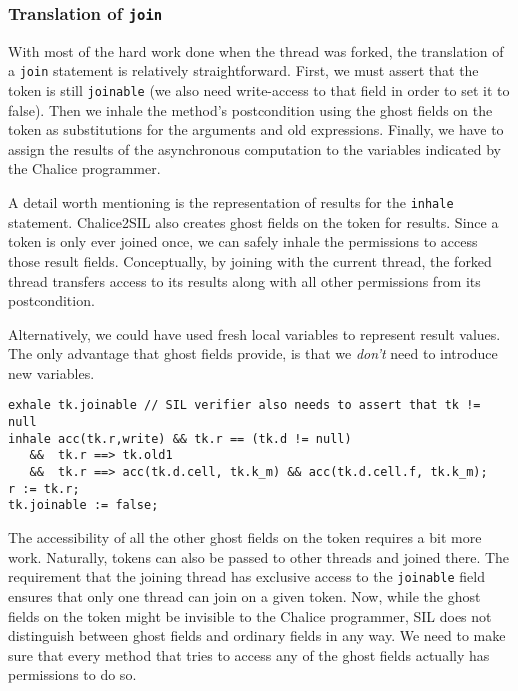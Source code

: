 \subsubsection{Translation of \lstinline!join!}\label{sct:fjjoin}
With most of the hard work done when the thread was forked, the translation of a \lstinline!join! statement is relatively straightforward.
First, we must assert that the token is still \lstinline!joinable! (we also need write-access to that field in order to set it to false). 
Then we inhale the method's postcondition using the ghost fields on the token as substitutions for the arguments and old expressions. 
Finally, we have to assign the results of the asynchronous computation to the variables indicated by the Chalice programmer.

A detail worth mentioning is the representation of results for the \lstinline!inhale! statement. 
Chalice2SIL also creates ghost fields on the token for results. 
Since a token is only ever joined once, we can safely inhale the permissions to access those result fields. 
Conceptually, by joining with the current thread, the forked thread transfers access to its results along with all other permissions from its postcondition.

Alternatively, we could have used fresh local variables to represent result values. The only advantage that ghost fields provide, is that we \emph{don't} need to introduce new variables.

\begin{lstlisting}[float,caption={Translation of the \lstinline!join! statement on line 24 in listing \ref{lst:fjexample}.},label=lst:fjexamplejoin,language=sil]
exhale tk.joinable // SIL verifier also needs to assert that tk != null
inhale acc(tk.r,write) && tk.r == (tk.d != null)
   &&  tk.r ==> tk.old1
   &&  tk.r ==> acc(tk.d.cell, tk.k_m) && acc(tk.d.cell.f, tk.k_m);
r := tk.r;
tk.joinable := false;
\end{lstlisting}

The accessibility of all the other ghost fields on the token requires a bit more work. 
Naturally, tokens can also be passed to other threads and joined there. 
The requirement that the joining thread has exclusive access to the \lstinline!joinable! field ensures that only one thread can join on a given token. 
Now, while the ghost fields on the token might be invisible to the Chalice programmer, SIL does not distinguish between ghost fields and ordinary fields in any way.
We need to make sure that every method that tries to access any of the ghost fields actually has permissions to do so.

